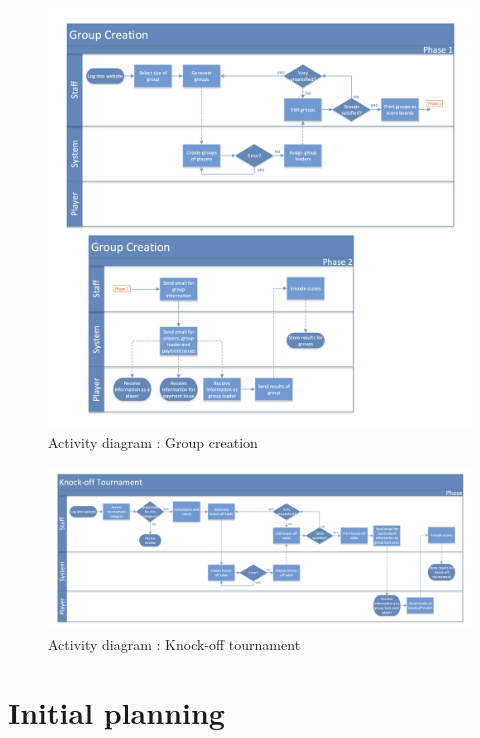 \begin{figure}[!ht]
	\centering
     \includegraphics[width=0.85\linewidth]{res/Activity-diagram-GC-03-v2.png}
     \caption{Activity diagram : Group creation}
\end{figure}

\begin{figure}[!ht]
	\centering
    \includegraphics[width=0.85\linewidth]{res/Activity-diagram-KT-04-v2.png}
    \caption{Activity diagram : Knock-off tournament}
\end{figure}
\FloatBarrier

\restoregeometry

\section{Initial planning}

